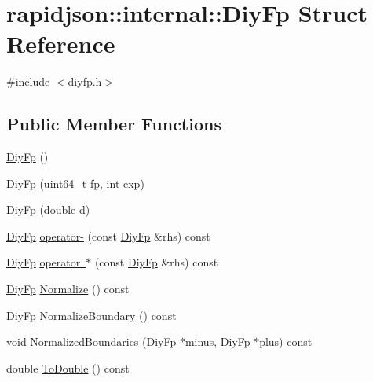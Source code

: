 \hypertarget{structrapidjson_1_1internal_1_1_diy_fp}{}\section{rapidjson\+::internal\+::Diy\+Fp Struct Reference}
\label{structrapidjson_1_1internal_1_1_diy_fp}


{\ttfamily \#include $<$diyfp.\+h$>$}

\subsection*{Public Member Functions}
\begin{DoxyCompactItemize}
\item 
\mbox{\hyperlink{structrapidjson_1_1internal_1_1_diy_fp_ad72d8da57a7a1dee28c820ce02dae736}{Diy\+Fp}} ()
\item 
\mbox{\hyperlink{structrapidjson_1_1internal_1_1_diy_fp_a5866b49b42cee6f878de04a076dde2e4}{Diy\+Fp}} (\mbox{\hyperlink{stdint_8h_aec6fcb673ff035718c238c8c9d544c47}{uint64\+\_\+t}} fp, int exp)
\item 
\mbox{\hyperlink{structrapidjson_1_1internal_1_1_diy_fp_a88b654a1915e003c50df581b9779e193}{Diy\+Fp}} (double d)
\item 
\mbox{\hyperlink{structrapidjson_1_1internal_1_1_diy_fp}{Diy\+Fp}} \mbox{\hyperlink{structrapidjson_1_1internal_1_1_diy_fp_a5ed5b6b81f93701e5b6f1f699eafce8b}{operator-\/}} (const \mbox{\hyperlink{structrapidjson_1_1internal_1_1_diy_fp}{Diy\+Fp}} \&rhs) const
\item 
\mbox{\hyperlink{structrapidjson_1_1internal_1_1_diy_fp}{Diy\+Fp}} \mbox{\hyperlink{structrapidjson_1_1internal_1_1_diy_fp_a9e2033aa6047bcb08f763a6e43c11f3b}{operator $\ast$}} (const \mbox{\hyperlink{structrapidjson_1_1internal_1_1_diy_fp}{Diy\+Fp}} \&rhs) const
\item 
\mbox{\hyperlink{structrapidjson_1_1internal_1_1_diy_fp}{Diy\+Fp}} \mbox{\hyperlink{structrapidjson_1_1internal_1_1_diy_fp_aa20a0598c891880ee34e8dca914f0117}{Normalize}} () const
\item 
\mbox{\hyperlink{structrapidjson_1_1internal_1_1_diy_fp}{Diy\+Fp}} \mbox{\hyperlink{structrapidjson_1_1internal_1_1_diy_fp_a974e356bbf967c43504e796628e61dc4}{Normalize\+Boundary}} () const
\item 
void \mbox{\hyperlink{structrapidjson_1_1internal_1_1_diy_fp_ab1a90e2dfc01d7ac05a08c7661635b84}{Normalized\+Boundaries}} (\mbox{\hyperlink{structrapidjson_1_1internal_1_1_diy_fp}{Diy\+Fp}} $\ast$minus, \mbox{\hyperlink{structrapidjson_1_1internal_1_1_diy_fp}{Diy\+Fp}} $\ast$plus) const
\item 
double \mbox{\hyperlink{structrapidjson_1_1internal_1_1_diy_fp_ae41b272b0beb25d936c5d79bd5fde310}{To\+Double}} () const
\end{DoxyCompactItemize}
